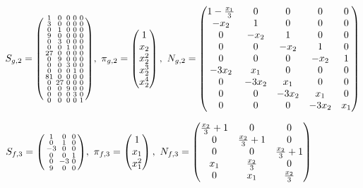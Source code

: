 \documentclass[fleqn]{article}
\begin{document}
\bigskip

$
S_{g,2} = \spmqty{ 1 & 0 & 0 & 0 & 0 \\ 3 & 0 & 0 & 0 & 0 \\ 0 & 1 & 0 & 0 & 0 \\ 9 & 0 & 0 & 0 & 0 \\ 0 & 3 & 0 & 0 & 0 \\ 0 & 0 & 1 & 0 & 0 \\ 27 & 0 & 0 & 0 & 0 \\ 0 & 9 & 0 & 0 & 0 \\ 0 & 0 & 3 & 0 & 0 \\ 0 & 0 & 0 & 1 & 0 \\ 81 & 0 & 0 & 0 & 0 \\ 0 & 27 & 0 & 0 & 0 \\ 0 & 0 & 9 & 0 & 0 \\ 0 & 0 & 0 & 3 & 0 \\ 0 & 0 & 0 & 0 & 1 },~
\pi_{g,2} = \pmqty{
    1       \\
    x_{2}   \\
    x_{2}^2 \\
    x_{2}^3 \\
    x_{2}^4 \\
},~
N_{g,2} = \pmqty{
    1-\frac{x_{1}}{3} & 0       & 0       & 0       & 0     \\
    -x_{2}            & 1       & 0       & 0       & 0     \\
    0                 & -x_{2}  & 1       & 0       & 0     \\
    0                 & 0       & -x_{2}  & 1       & 0     \\
    0                 & 0       & 0       & -x_{2}  & 1     \\
    -3x_{2}           & x_{1}   & 0       & 0       & 0     \\
    0                 & -3x_{2} & x_{1}   & 0       & 0     \\
    0                 & 0       & -3x_{2} & x_{1}   & 0     \\
    0                 & 0       & 0       & -3x_{2} & x_{1} \\
}
$

\bigskip

$
S_{f,3} = \spmqty{ 1 & 0 & 0 \\ 0 & 1 & 0 \\ -3 & 0 & 0 \\ 0 & 0 & 1 \\ 0 & -3 & 0 \\ 9 & 0 & 0 },~
\pi_{f,3} = \pmqty{
    1       \\
    x_{1}   \\
    x_{1}^2 \\
},~
N_{f,3} = \pmqty{
    \frac{x_{2}}{3}+1 & 0                 & 0                 \\
    0                 & \frac{x_{2}}{3}+1 & 0                 \\
    0                 & 0                 & \frac{x_{2}}{3}+1 \\
    x_{1}             & \frac{x_{2}}{3}   & 0                 \\
    0                 & x_{1}             & \frac{x_{2}}{3}   \\
}
$
\end{document}
